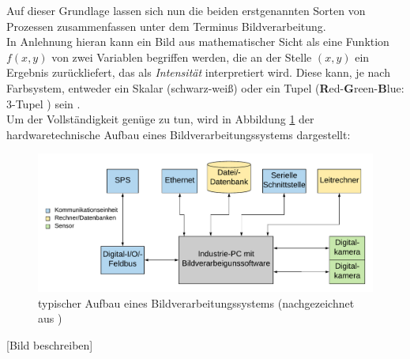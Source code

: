 		Auf dieser Grundlage lassen sich nun die beiden erstgenannten Sorten von Prozessen zusammenfassen unter dem Terminus Bildverarbeitung. \\
		In Anlehnung hieran kann ein Bild aus mathematischer Sicht als eine Funktion $f(x, y)$ von zwei Variablen begriffen werden, die an der Stelle $(x, y)$ ein Ergebnis zurückliefert, das als \textit{Intensität} interpretiert wird. Diese kann, je nach Farbsystem, entweder ein Skalar (schwarz-weiß) oder ein Tupel (\textbf{R}ed-\textbf{G}reen-\textbf{B}lue: 3-Tupel \cite{rgb-info}) sein \cite[S. 50]{gonzalez-woods}. \\
		Um der Vollständigkeit genüge zu tun, wird in Abbildung \ref{fig:indust-imgproc} der hardwaretechnische Aufbau eines Bildverarbeitungssystems dargestellt:
		\begin{figure}[H]
			\includegraphics[width=\linewidth]{Industrielles-Bildverarbeitungssystem}
			\caption{typischer Aufbau eines Bildverarbeitungssystems (nachgezeichnet aus \cite[S. 7]{indust-imgproc})}
			\label{fig:indust-imgproc}
		\end{figure}
		\color{red} [Bild beschreiben] \color{black}
		\vfill
